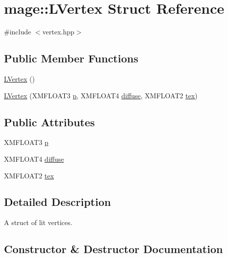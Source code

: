 \hypertarget{structmage_1_1_l_vertex}{}\section{mage\+:\+:L\+Vertex Struct Reference}
\label{structmage_1_1_l_vertex}


{\ttfamily \#include $<$vertex.\+hpp$>$}

\subsection*{Public Member Functions}
\begin{DoxyCompactItemize}
\item 
\hyperlink{structmage_1_1_l_vertex_abfc69fb38d5f37b07d1c420a23a3e7f9}{L\+Vertex} ()
\item 
\hyperlink{structmage_1_1_l_vertex_a943f361fc84d2223dd317a4b20622f40}{L\+Vertex} (X\+M\+F\+L\+O\+A\+T3 \hyperlink{structmage_1_1_l_vertex_afdf01d172b1992d4e4f37b9ad9fb2d27}{p}, X\+M\+F\+L\+O\+A\+T4 \hyperlink{structmage_1_1_l_vertex_abfe65c089e650ad20ed41de8e2b585dd}{diffuse}, X\+M\+F\+L\+O\+A\+T2 \hyperlink{structmage_1_1_l_vertex_abeca49c231f9b85063dbd4c0522d7edc}{tex})
\end{DoxyCompactItemize}
\subsection*{Public Attributes}
\begin{DoxyCompactItemize}
\item 
X\+M\+F\+L\+O\+A\+T3 \hyperlink{structmage_1_1_l_vertex_afdf01d172b1992d4e4f37b9ad9fb2d27}{p}
\item 
X\+M\+F\+L\+O\+A\+T4 \hyperlink{structmage_1_1_l_vertex_abfe65c089e650ad20ed41de8e2b585dd}{diffuse}
\item 
X\+M\+F\+L\+O\+A\+T2 \hyperlink{structmage_1_1_l_vertex_abeca49c231f9b85063dbd4c0522d7edc}{tex}
\end{DoxyCompactItemize}


\subsection{Detailed Description}
A struct of lit vertices. 

\subsection{Constructor \& Destructor Documentation}
\hypertarget{structmage_1_1_l_vertex_abfc69fb38d5f37b07d1c420a23a3e7f9}{}\label{structmage_1_1_l_vertex_abfc69fb38d5f37b07d1c420a23a3e7f9} 
